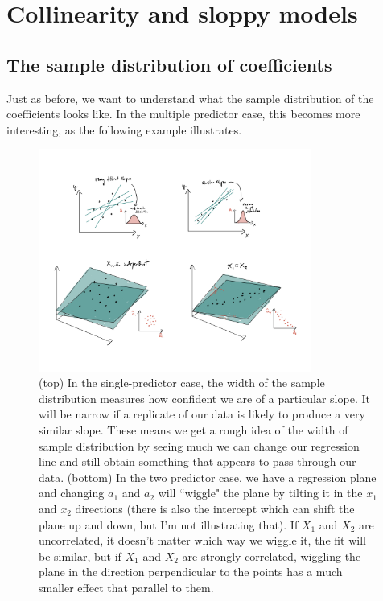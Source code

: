 \section{Collinearity and sloppy models}

\subsection{The sample distribution of coefficients}
Just as before, we want to understand what the sample distribution of the coefficients looks like. In the multiple predictor case, this becomes more interesting, as the following example illustrates. 


\begin{figure}[h]
    \centering
    \includegraphics[width=0.8\textwidth]{sample_dist}
    \caption{(top) In the single-predictor case, the width of the sample distribution measures how confident we are of a particular slope. It will be narrow if a replicate of our data is likely to produce a very similar slope.  These means we get a rough idea of the width of sample distribution by seeing much we can change our regression line and still obtain something that appears to pass through our data. (bottom) In the two predictor case, we have a regression plane and changing $a_1$ and $a_2$ will ``wiggle" the plane by tilting it in the $x_1$ and $x_2$ directions (there is also the intercept which can shift the plane up and down, but I'm not illustrating that). If $X_1$ and $X_2$ are uncorrelated, it doesn't matter which way we wiggle it, the fit will be similar, but if $X_1$ and $X_2$ are strongly correlated, wiggling the plane in the direction perpendicular  to the points has a much smaller effect that parallel to them. }
    \label{fig:sample_dist}
\end{figure}



